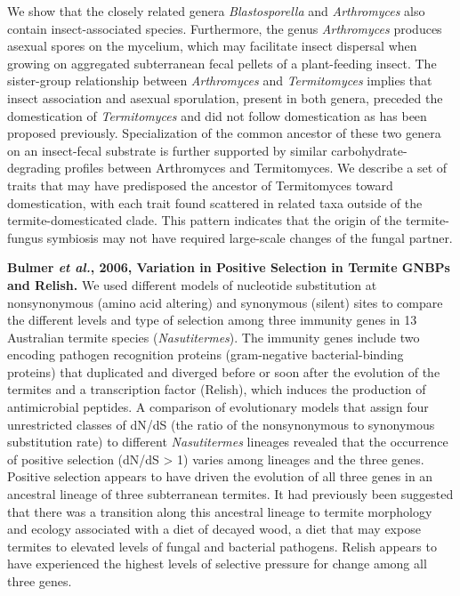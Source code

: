 \documentclass[11pt]{article}
\begin{document}
\begin{sloppypar}
We show that the closely related genera \textit{Blastosporella} and \textit{Arthromyces} also contain insect-associated species. 
Furthermore, the genus \textit{Arthromyces} produces asexual spores on the mycelium, which may facilitate insect dispersal when growing on aggregated subterranean fecal pellets of a plant-feeding insect. 
The sister-group relationship between \textit{Arthromyces} and \textit{Termitomyces} implies that insect association and asexual sporulation, present in both genera, preceded the domestication of \textit{Termitomyces} and did not follow domestication as has been proposed previously. 
Specialization of the common ancestor of these two genera on an insect-fecal substrate is further supported by similar carbohydrate-degrading profiles between Arthromyces and Termitomyces. 
We describe a set of traits that may have predisposed the ancestor of Termitomyces toward domestication, with each trait found scattered in related taxa outside of the termite-domesticated clade. 
This pattern indicates that the origin of the termite-fungus symbiosis may not have required large-scale changes of the fungal partner.
\par
\textbf{Bulmer \textit{et al.}, 2006, Variation in Positive Selection in Termite GNBPs and Relish.} \newline
We used different models of nucleotide substitution at nonsynonymous (amino acid altering) and synonymous (silent) sites to compare the different levels and type of selection among three immunity genes in 13 Australian termite species (\textit{Nasutitermes}). 
The immunity genes include two encoding pathogen recognition proteins (gram-negative bacterial-binding proteins) that duplicated and diverged before or soon after the evolution of the termites and a transcription factor (Relish), which induces the production of antimicrobial peptides. 
A comparison of evolutionary models that assign four unrestricted classes of dN/dS (the ratio of the nonsynonymous to synonymous substitution rate) to different \textit{Nasutitermes} lineages revealed that the occurrence of positive selection (dN/dS > 1) varies among lineages and the three genes. 
Positive selection appears to have driven the evolution of all three genes in an ancestral lineage of three subterranean termites. 
It had previously been suggested that there was a transition along this ancestral lineage to termite morphology and ecology associated with a diet of decayed wood, a diet that may expose termites to elevated levels of fungal and bacterial pathogens. 
Relish appears to have experienced the highest levels of selective pressure for change among all three genes. 

\end{sloppypar}
\end{document}

